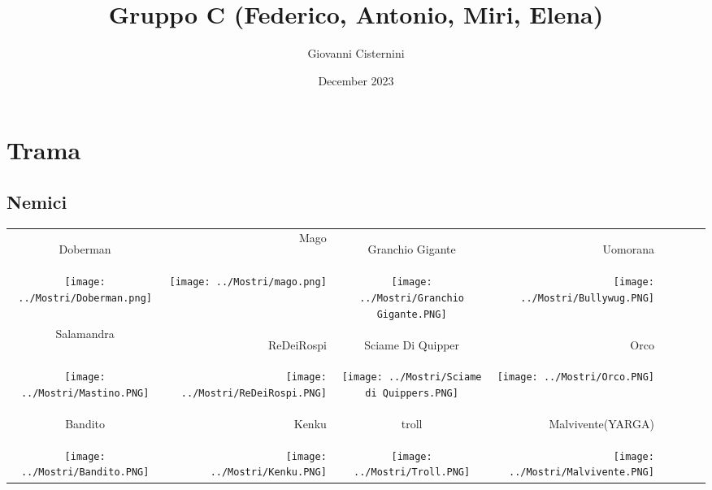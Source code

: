 \documentclass{article}
\title{Gruppo C (Federico, Antonio, Miri, Elena)}
\author{Giovanni Cisternini}
\date{December 2023}
\begin{document}
\tableofcontents

\section{Trama}

\subsection{Nemici}
\begin{table}
    \centering
    \begin{tabular}{|cr|cr|cr|cr|}
        \hline
        \hypertarget{doberman}{Doberman} & Mago & \hypertarget{granchio}{Granchio Gigante} & \hypertarget{uomorana}{Uomorana}\\
        \texttt{[image: ../Mostri/Doberman.png]} &  \texttt{[image: ../Mostri/mago.png]} &\texttt{[image: ../Mostri/Granchio Gigante.PNG]} &  \texttt{[image: ../Mostri/Bullywug.PNG]} \\
        \hline
        Salamandra & \hypertarget{re}{ReDeiRospi} &  \hypertarget{sciame}{Sciame Di Quipper} & \hypertarget{orco}{Orco}\\
        \texttt{[image: ../Mostri/Mastino.PNG]} & \texttt{[image: ../Mostri/ReDeiRospi.PNG]} &  \texttt{[image: ../Mostri/Sciame di Quippers.PNG]} & \texttt{[image: ../Mostri/Orco.PNG]}\\
        \hline 
        \hypertarget{bandito}{Bandito} & \hypertarget{kenk}{Kenku} &  \hypertarget{troll}{troll} &  \hypertarget{malvivente}{Malvivente(YARGA)}\\
        \texttt{[image: ../Mostri/Bandito.PNG]} & \texttt{[image: ../Mostri/Kenku.PNG]} & \texttt{[image: ../Mostri/Troll.PNG]} & \texttt{[image: ../Mostri/Malvivente.PNG]}
        
    \end{tabular}
\end{table}
\end{document}
